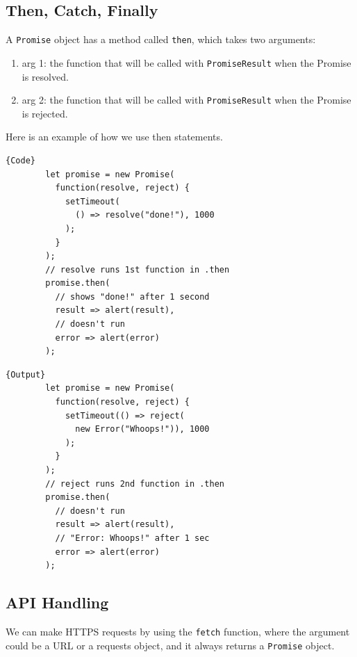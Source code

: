 \documentclass{article}
\begin{document}
  \subsection{Then, Catch, Finally}

    A \texttt{Promise} object has a method called \texttt{then}, which takes two arguments: 
    \begin{enumerate}
      \item arg 1: the function that will be called with \texttt{PromiseResult} when the Promise is resolved. 
      \item arg 2: the function that will be called with \texttt{PromiseResult} when the Promise is rejected. 
    \end{enumerate}

    \begin{example}
      Here is an example of how we use then statements. 
      
      \noindent\begin{minipage}{.5\textwidth}
      \begin{lstlisting}[]{Code}
        let promise = new Promise(
          function(resolve, reject) {
            setTimeout(
              () => resolve("done!"), 1000
            );
          }
        );
        // resolve runs 1st function in .then
        promise.then(
          // shows "done!" after 1 second
          result => alert(result), 
          // doesn't run
          error => alert(error) 
        );
      \end{lstlisting}
      \end{minipage}
      \hfill
      \begin{minipage}{.49\textwidth}
      \begin{lstlisting}[]{Output}
        let promise = new Promise(
          function(resolve, reject) {
            setTimeout(() => reject(
              new Error("Whoops!")), 1000
            );
          }
        );
        // reject runs 2nd function in .then
        promise.then(
          // doesn't run
          result => alert(result), 
          // "Error: Whoops!" after 1 sec 
          error => alert(error) 
        ); 
      \end{lstlisting}
      \end{minipage}
    \end{example}

  \subsection{API Handling} 

    We can make HTTPS requests by using the \texttt{fetch} function, where the argument could be a URL or a requests object, and it always returns a \texttt{Promise} object. 
\end{document}

